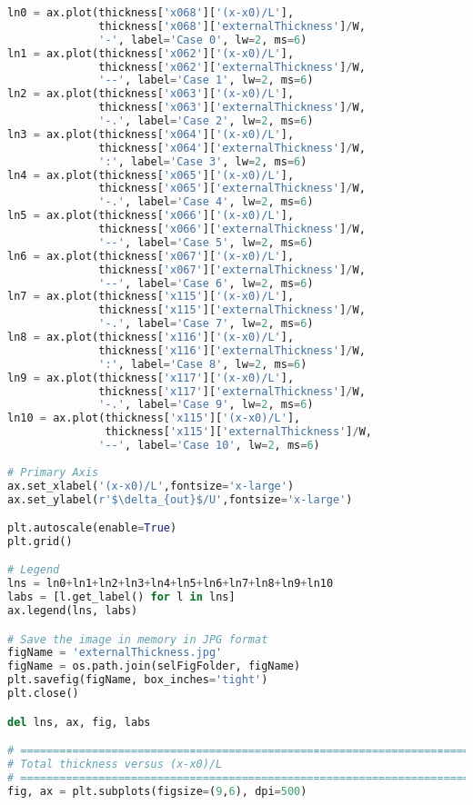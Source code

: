 \begin{lstlisting}[language=python]
ln0 = ax.plot(thickness['x068']['(x-x0)/L'],
              thickness['x068']['externalThickness']/W,
              '-', label='Case 0', lw=2, ms=6)
ln1 = ax.plot(thickness['x062']['(x-x0)/L'],
              thickness['x062']['externalThickness']/W,
              '--', label='Case 1', lw=2, ms=6)
ln2 = ax.plot(thickness['x063']['(x-x0)/L'],
              thickness['x063']['externalThickness']/W,
              '-.', label='Case 2', lw=2, ms=6)
ln3 = ax.plot(thickness['x064']['(x-x0)/L'],
              thickness['x064']['externalThickness']/W,
              ':', label='Case 3', lw=2, ms=6)
ln4 = ax.plot(thickness['x065']['(x-x0)/L'],
              thickness['x065']['externalThickness']/W,
              '-.', label='Case 4', lw=2, ms=6)
ln5 = ax.plot(thickness['x066']['(x-x0)/L'],
              thickness['x066']['externalThickness']/W,
              '--', label='Case 5', lw=2, ms=6)
ln6 = ax.plot(thickness['x067']['(x-x0)/L'],
              thickness['x067']['externalThickness']/W,
              '--', label='Case 6', lw=2, ms=6)
ln7 = ax.plot(thickness['x115']['(x-x0)/L'],
              thickness['x115']['externalThickness']/W,
              '-.', label='Case 7', lw=2, ms=6)
ln8 = ax.plot(thickness['x116']['(x-x0)/L'],
              thickness['x116']['externalThickness']/W,
              ':', label='Case 8', lw=2, ms=6)
ln9 = ax.plot(thickness['x117']['(x-x0)/L'],
              thickness['x117']['externalThickness']/W,
              '-.', label='Case 9', lw=2, ms=6)
ln10 = ax.plot(thickness['x115']['(x-x0)/L'],
               thickness['x115']['externalThickness']/W,
              '--', label='Case 10', lw=2, ms=6)
    
# Primary Axis
ax.set_xlabel('(x-x0)/L',fontsize='x-large')
ax.set_ylabel(r'$\delta_{out}$/U',fontsize='x-large')

plt.autoscale(enable=True)
plt.grid()

# Legend
lns = ln0+ln1+ln2+ln3+ln4+ln5+ln6+ln7+ln8+ln9+ln10
labs = [l.get_label() for l in lns]
ax.legend(lns, labs)

# Save the image in memory in JPG format
figName = 'externalThickness.jpg'
figName = os.path.join(selFigFolder, figName)
plt.savefig(figName, box_inches='tight')
plt.close()

del lns, ax, fig, labs

# =============================================================================
# Total thickness versus (x-x0)/L
# =============================================================================
fig, ax = plt.subplots(figsize=(9,6), dpi=500)


\end{lstlisting}
